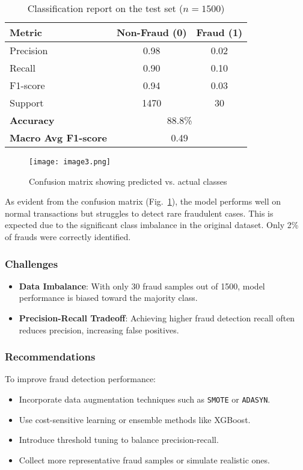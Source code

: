 \documentclass[12pt]{article}
\begin{document}
\begin{table}
\centering
\begin{tabular}{@{}lcc@{}}
\toprule
\textbf{Metric} & \textbf{Non-Fraud (0)} & \textbf{Fraud (1)} \\ \midrule
Precision       & 0.98                   & 0.02               \\
Recall          & 0.90                   & 0.10               \\
F1-score        & 0.94                   & 0.03               \\
Support         & 1470                   & 30                 \\ \midrule
\textbf{Accuracy} & \multicolumn{2}{c}{88.8\%} \\
\textbf{Macro Avg F1-score} & \multicolumn{2}{c}{0.49} \\
\bottomrule
\end{tabular}
\caption{Classification report on the test set ($n = 1500$)}
\label{tab:classification}
\end{table}


\begin{figure}
\centering
\texttt{[image: image3.png]}
\caption{Confusion matrix showing predicted vs. actual classes}
\label{fig:confusion}
\end{figure}

As evident from the confusion matrix (Fig.~\ref{fig:confusion}), the model performs well on normal transactions but struggles to detect rare fraudulent cases. This is expected due to the significant class imbalance in the original dataset. Only 2\% of frauds were correctly identified.

\subsubsection*{Challenges}
\begin{itemize}
    \item \textbf{Data Imbalance}: With only 30 fraud samples out of 1500, model performance is biased toward the majority class.
    \item \textbf{Precision-Recall Tradeoff}: Achieving higher fraud detection recall often reduces precision, increasing false positives.
\end{itemize}

\subsubsection*{Recommendations}
To improve fraud detection performance:
\begin{itemize}
    \item Incorporate data augmentation techniques such as \texttt{SMOTE} or \texttt{ADASYN}.
    \item Use cost-sensitive learning or ensemble methods like XGBoost.
    \item Introduce threshold tuning to balance precision-recall.
    \item Collect more representative fraud samples or simulate realistic ones.
\end{itemize}
\end{document}
